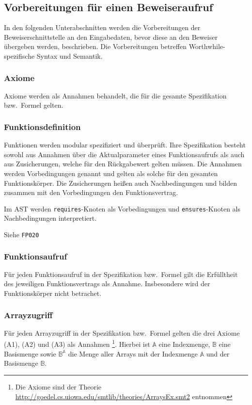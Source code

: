 \subsection{Vorbereitungen für einen Beweiseraufruf}%

In den folgenden Unterabschnitten werden die Vorbereitungen der
Beweiserschnittstelle an den Eingabedaten, bevor diese an den
Beweiser übergeben werden, beschrieben. Die Vorbereitungen
betreffen Worthwhile-spezifische Syntax und Semantik.%

\subsubsection{Axiome}%

Axiome werden als Annahmen behandelt, die für die gesamte
Spezifikation bzw.\ Formel gelten.%

\subsubsection{Funktionsdefinition}%

Funktionen werden modular spezifiziert und überprüft. Ihre
Spezifikation besteht sowohl aus Annahmen über die Aktualparameter
eines Funktionsaufrufs als auch aus Zusicherungen, welche für den
Rückgabewert gelten müssen. Die Annahmen werden Vorbedingungen
genannt und gelten als solche für den gesamten Funktionskörper. Die
Zusicherungen heißen auch Nachbedingungen und bilden zusammen mit den
Vorbedingungen den Funktionsvertrag.%

Im AST werden \texttt{requires}-Knoten als Vorbedingungen und
\texttt{ensures}-Knoten als Nachbedingungen interpretiert.%

Siehe \texttt{FP020}%

\subsubsection{Funktionsaufruf}%

Für jeden Funktionsaufruf in der Spezifikation bzw.\ Formel gilt die
Erfülltheit des jeweiligen Funktionsvertrags als Annahme. Insbesondere
wird der Funktionskörper nicht betrachet.%

\subsubsection{Arrayzugriff}%

Für jeden Arrayzugriff in der Spezifikation bzw.\ Formel gelten die
drei Axiome (A1), (A2) und (A3) als Annahmen \footnote{Die Axiome sind
der Theorie
\url{http://goedel.cs.uiowa.edu/smtlib/theories/ArraysEx.smt2}
entnommen}. Hierbei ist $\mathbb{A}$ eine Indexmenge, $\mathbb{B}$
eine Basismenge sowie $\mathbb{B}^\mathbb{A}$ die Menge aller Arrays
mit der Indexmenge $\mathbb{A}$ und der Basismenge $\mathbb{B}$. %

